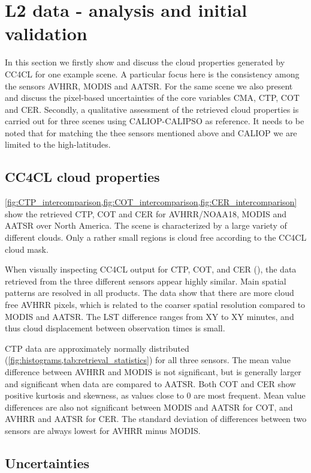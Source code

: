 \section{L2 data - analysis and initial validation}\label{L2_data}

{\color{red}In this section we firstly show and discuss the cloud properties generated by CC4CL for one example scene. A particular focus here is the consistency among the sensors AVHRR, MODIS and AATSR. For the same scene we also present and discuss the pixel-based uncertainties of the core variables CMA, CTP, COT and CER. Secondly, a qualitative assessment of the retrieved cloud properties is carried out for three scenes using CALIOP-CALIPSO as reference.
It needs to be noted that for matching the thee sensors mentioned above and CALIOP we are limited to the high-latitudes.

\subsection{CC4CL cloud properties}
\cref{fig:CTP_intercomparison,fig:COT_intercomparison,fig:CER_intercomparison} show the retrieved CTP, COT and CER for AVHRR/NOAA18, MODIS and AATSR over North America. The scene is characterized by a large variety of different clouds. Only a rather small regions is cloud free according to the CC4CL cloud mask.

When visually inspecting CC4CL output for CTP, COT, and CER (), the data retrieved from the three different sensors appear highly similar. Main spatial patterns are resolved in all products. The data show that there are more cloud free AVHRR pixels, which is related to the coarser spatial resolution compared to MODIS and AATSR. The LST difference ranges from XY to XY minutes, and thus cloud displacement between observation times is small.

CTP data are approximately normally distributed (\cref{fig:histograms,tab:retrieval_statistics}) for all three sensors. The mean value difference between AVHRR and MODIS is not significant, but is generally larger and significant when data are compared to AATSR. Both COT and CER show positive kurtosis and skewness, as values close to 0 are most frequent. Mean value differences are also not significant between MODIS and AATSR for COT, and AVHRR and AATSR for CER. The standard deviation of differences between two sensors are always lowest for AVHRR minus MODIS.}

\subsection{Uncertainties}

